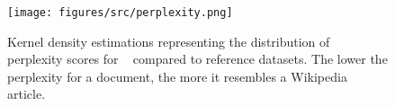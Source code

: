 \begin{figure}
    \centering
    \texttt{[image: figures/src/perplexity.png]}
    \caption{Kernel density estimations representing the distribution of perplexity scores for \DatasetName~ compared to reference datasets. 
    The lower the perplexity for a document, the more it resembles a Wikipedia article.}
    \label{fig:perplexity_distribution}
\end{figure}